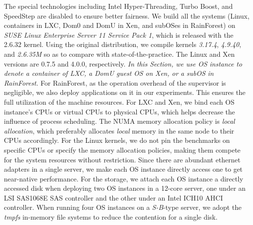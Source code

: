 \documentclass[pageno]{jpaper}
\begin{document}
The special technologies including Intel Hyper-Threading, Turbo Boost, and SpeedStep are disabled to ensure better fairness.
We build all the systems (Linux, containers in LXC, Dom0 and DomU in Xen, and subOSes in RainForest) on \emph{SUSE Linux Enterprise Server 11 Service Pack 1}, which is released with the 2.6.32 kernel. Using the original distribution, we compile kernels \emph{3.17.4}, \emph{4.9.40}, and \emph{2.6.35M} so as to compare with  state-of-the-practice. The Linux and Xen versions are 0.7.5 and 4.0.0, respectively. \emph{In this Section, we use \emph{OS instance} to denote a container of LXC, a DomU guest OS on Xen, or a subOS in RainForest.} For RainForest, as the operation overhead of the supervisor is negligible, we also deploy applications on it in our experiments. This ensures the full utilization of the machine resources.
For LXC and Xen, we bind each OS instance's CPUs or virtual CPUs to physical CPUs, which helps decrease the influence of process scheduling. The NUMA memory allocation policy is \emph{local allocation}, which preferably allocates \emph{local} memory in the same node to their CPUs accordingly. For the Linux kernels, we do not pin the benchmarks on specific CPUs or specify the memory allocation policies, making them compete for the system resources without restriction. Since there are abundant ethernet adapters in a single server, we make each OS instance directly access one to get near-native performance. For the storage, we attach each OS instance a directly accessed disk when deploying two OS instances in a 12-core server, one under an LSI SAS1068E SAS controller and the other under an Intel ICH10 AHCI controller.
When running four OS instances on a \emph{S-B}-type server, we adopt the \emph{tmpfs} in-memory file systems to reduce the contention for a single disk.
\end{document}
